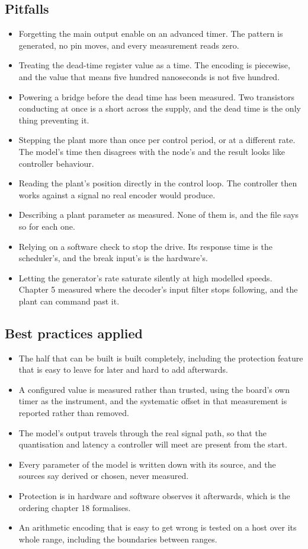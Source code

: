 \subsection*{Pitfalls}

\begin{itemize}
\item Forgetting the main output enable on an advanced timer. The pattern is
generated, no pin moves, and every measurement reads zero.
\item Treating the dead-time register value as a time. The encoding is
piecewise, and the value that means five hundred nanoseconds is not five
hundred.
\item Powering a bridge before the dead time has been measured. Two transistors
conducting at once is a short across the supply, and the dead time is the only
thing preventing it.
\item Stepping the plant more than once per control period, or at a different
rate. The model's time then disagrees with the node's and the result looks like
controller behaviour.
\item Reading the plant's position directly in the control loop. The controller
then works against a signal no real encoder would produce.
\item Describing a plant parameter as measured. None of them is, and the file
says so for each one.
\item Relying on a software check to stop the drive. Its response time is the
scheduler's, and the break input's is the hardware's.
\item Letting the generator's rate saturate silently at high modelled speeds.
Chapter 5 measured where the decoder's input filter stops following, and the
plant can command past it.
\end{itemize}

\subsection*{Best practices applied}

\begin{itemize}
\item The half that can be built is built completely, including the protection
feature that is easy to leave for later and hard to add afterwards.
\item A configured value is measured rather than trusted, using the board's own
timer as the instrument, and the systematic offset in that measurement is
reported rather than removed.
\item The model's output travels through the real signal path, so that the
quantisation and latency a controller will meet are present from the start.
\item Every parameter of the model is written down with its source, and the
sources say derived or chosen, never measured.
\item Protection is in hardware and software observes it afterwards, which is
the ordering chapter 18 formalises.
\item An arithmetic encoding that is easy to get wrong is tested on a host over
its whole range, including the boundaries between ranges.
\end{itemize}

